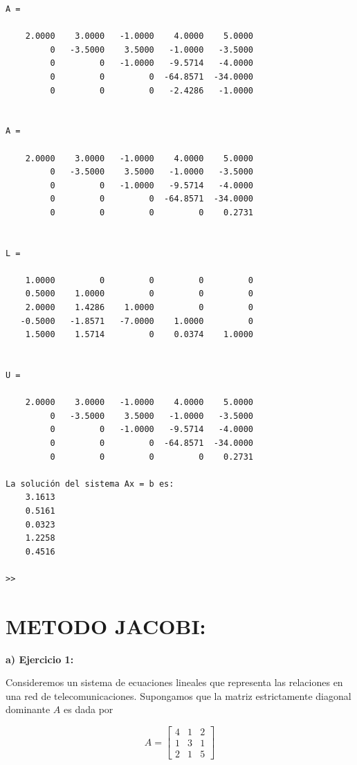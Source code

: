 \documentclass[12pt,a4paper,twoside]{article}  %
\begin{document}
\begin{verbatim}
A =

    2.0000    3.0000   -1.0000    4.0000    5.0000
         0   -3.5000    3.5000   -1.0000   -3.5000
         0         0   -1.0000   -9.5714   -4.0000
         0         0         0  -64.8571  -34.0000
         0         0         0   -2.4286   -1.0000


A =

    2.0000    3.0000   -1.0000    4.0000    5.0000
         0   -3.5000    3.5000   -1.0000   -3.5000
         0         0   -1.0000   -9.5714   -4.0000
         0         0         0  -64.8571  -34.0000
         0         0         0         0    0.2731


L =

    1.0000         0         0         0         0
    0.5000    1.0000         0         0         0
    2.0000    1.4286    1.0000         0         0
   -0.5000   -1.8571   -7.0000    1.0000         0
    1.5000    1.5714         0    0.0374    1.0000


U =

    2.0000    3.0000   -1.0000    4.0000    5.0000
         0   -3.5000    3.5000   -1.0000   -3.5000
         0         0   -1.0000   -9.5714   -4.0000
         0         0         0  -64.8571  -34.0000
         0         0         0         0    0.2731

La solución del sistema Ax = b es:
    3.1613
    0.5161
    0.0323
    1.2258
    0.4516

>> 

\end{verbatim}




\section{METODO JACOBI:}

\textbf{a) Ejercicio 1: }

Consideremos un sistema de ecuaciones lineales que representa las relaciones en una red de telecomunicaciones. Supongamos que la matriz estrictamente diagonal dominante \( A \) es dada por 

\[
A = \begin{bmatrix}
4 & 1 & 2 \\
1 & 3 & 1 \\
2 & 1 & 5
\end{bmatrix}
\]
\end{document}
